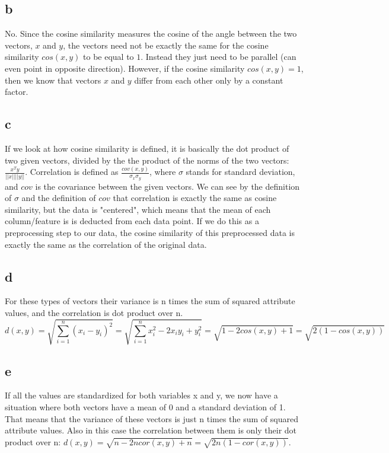 \documentclass{article}
\begin{document}
\subsection{b}
No. Since the cosine similarity measures the cosine of the angle between the two vectors, $x$ and $y$, the vectors need not be exactly the same for the cosine similarity $cos(x,y)$ to be equal to $1$. Instead they just need to be parallel (can even point in opposite direction). However, if the cosine similarity $cos(x,y) = 1$, then we know that vectors $x$ and $y$ differ from each other only by a constant factor.

\subsection{c}
If we look at how cosine similarity is defined, it is basically the dot product of two given vectors, divided by the the product of the norms of the two vectors: $\frac{x^Ty}{||x|| ||y||}$. Correlation is defined as $\frac{cov(x, y)}{\sigma_x \sigma_y}$, where $\sigma$ stands for standard deviation, and $cov$ is the covariance between the given vectors. We can see by the definition of $\sigma$ and the definition of $cov$ that correlation is exactly the same as cosine similarity, but the data is "centered", which means that the mean of each column/feature is is deducted from each data point. If we do this as a preprocessing step to our data, the cosine similarity of this preprocessed data is exactly the same as the correlation of the original data. 

\subsection{d}
For these types of vectors their variance is n times the sum of squared attribute values, and the correlation is dot product over n.
\begin{equation}
d(x,y)=\sqrt{\sum_{i=1}^{n} (x_i - y_i)^2} = \sqrt{\sum_{i=1}^{n} x_i^2 - 2x_iy_i + y_i^2} = \sqrt{1 - 2cos(x,y) + 1} = \sqrt{2(1 - cos(x,y))}
\end{equation}

\subsection{e}
If all the values are standardized for both variables x and y, we now have a situation where both vectors have a mean of 0 and a standard deviation of 1. That means that the variance of these vectors is just n times the sum of squared attribute values. Also in this case the correlation between them is only their dot product over n: $d(x,y)=\sqrt{n - 2ncor(x,y) + n} = \sqrt{2n(1-cor(x,y))}$.
\end{document}

